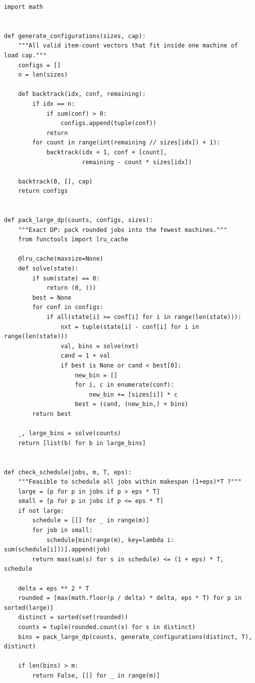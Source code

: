 \begin{lstlisting}[style=python, caption=Hochbaum-Shmoys PTAS for Minimum Makespan]
import math


def generate_configurations(sizes, cap):
    """All valid item-count vectors that fit inside one machine of load cap."""
    configs = []
    n = len(sizes)

    def backtrack(idx, conf, remaining):
        if idx == n:
            if sum(conf) > 0:
                configs.append(tuple(conf))
            return
        for count in range(int(remaining // sizes[idx]) + 1):
            backtrack(idx + 1, conf + [count],
                      remaining - count * sizes[idx])

    backtrack(0, [], cap)
    return configs


def pack_large_dp(counts, configs, sizes):
    """Exact DP: pack rounded jobs into the fewest machines."""
    from functools import lru_cache

    @lru_cache(maxsize=None)
    def solve(state):
        if sum(state) == 0:
            return (0, ())
        best = None
        for conf in configs:
            if all(state[i] >= conf[i] for i in range(len(state))):
                nxt = tuple(state[i] - conf[i] for i in range(len(state)))
                val, bins = solve(nxt)
                cand = 1 + val
                if best is None or cand < best[0]:
                    new_bin = []
                    for i, c in enumerate(conf):
                        new_bin += [sizes[i]] * c
                    best = (cand, (new_bin,) + bins)
        return best

    _, large_bins = solve(counts)
    return [list(b) for b in large_bins]


def check_schedule(jobs, m, T, eps):
    """Feasible to schedule all jobs within makespan (1+eps)*T ?"""
    large = [p for p in jobs if p > eps * T]
    small = [p for p in jobs if p <= eps * T]
    if not large:
        schedule = [[] for _ in range(m)]
        for job in small:
            schedule[min(range(m), key=lambda i: sum(schedule[i]))].append(job)
        return max(sum(s) for s in schedule) <= (1 + eps) * T, schedule

    delta = eps ** 2 * T
    rounded = [max(math.floor(p / delta) * delta, eps * T) for p in sorted(large)]
    distinct = sorted(set(rounded))
    counts = tuple(rounded.count(s) for s in distinct)
    bins = pack_large_dp(counts, generate_configurations(distinct, T), distinct)

    if len(bins) > m:
        return False, [[] for _ in range(m)]


\end{lstlisting}
